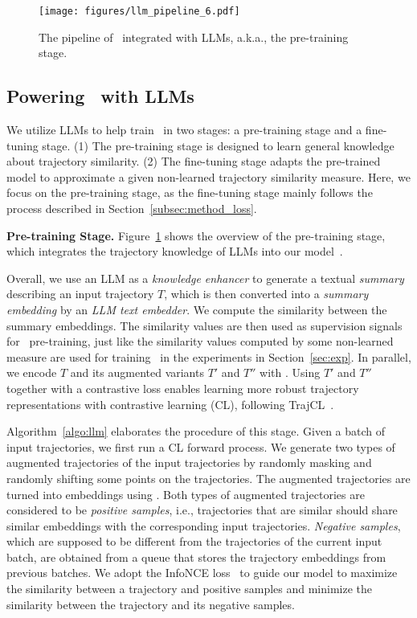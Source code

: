 \begin{figure}[th]
    \centering
    \texttt{[image: figures/llm\_pipeline\_6.pdf]}
    \caption{The pipeline of \model\ integrated with LLMs, a.k.a., the pre-training stage.}\label{fig:llm_pipeline}
\end{figure}


\subsection{Powering \model\ with LLMs}\label{subsec:llm_empirical}
We utilize LLMs to help train \model\ in two stages: a pre-training stage and a fine-tuning stage. 
(1) The pre-training stage is designed to learn general knowledge about trajectory similarity.
(2) The fine-tuning stage adapts the pre-trained model to approximate a given non-learned trajectory similarity measure. 
Here, we  focus on the pre-training stage, as the fine-tuning stage mainly follows the process described in Section~\ref{subsec:method_loss}.

\textbf{Pre-training Stage.}
Figure~\ref{fig:llm_pipeline} shows the overview of  the pre-training stage, which  integrates the trajectory knowledge of LLMs into our model~\model.



Overall, we use an LLM as a \emph{knowledge enhancer} to generate a textual \emph{summary} describing an input trajectory $T$, which is then converted into 
a \emph{summary embedding} by an \emph{LLM text embedder}. We compute the similarity between the summary embeddings. The similarity values are then used as supervision signals for \model\ pre-training, just like the similarity values computed by some non-learned measure are used for training \model\ in the experiments in Section~\ref{sec:exp}. 
In parallel, we encode $T$ and its augmented variants $T'$ and $T''$ with \model. Using $T'$ and $T''$ together with a contrastive loss enables learning more robust trajectory representations with contrastive learning (CL), following TrajCL~\cite{trajcl}. 


Algorithm~\ref{algo:llm} elaborates the procedure of this stage.
Given a batch of input trajectories, we first run a CL forward process. We generate two types of augmented trajectories of the input trajectories by randomly masking and randomly shifting some points on the trajectories. The augmented trajectories are turned into embeddings using \model. Both types of augmented trajectories are considered to be \emph{positive samples}, i.e., trajectories that are similar should share similar embeddings with the corresponding input trajectories. \emph{Negative samples}, which are supposed to be different from the trajectories of the current input batch, are obtained from 
a queue that stores the trajectory embeddings from previous batches.
We adopt the InfoNCE loss~\cite{infonce} to guide our model to maximize the similarity  between a trajectory and positive samples and minimize the similarity between  the trajectory and its negative samples.

